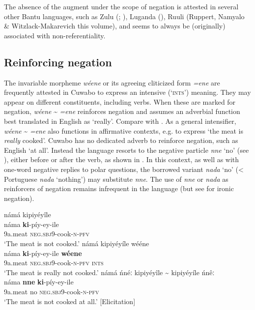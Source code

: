 \documentclass[output=paper,colorlinks=true, citecolor=brown,draftmode]{langscibook}
\begin{document}
The absence of the augment under the scope of negation is attested in several other Bantu languages, such as Zulu (\citealt{Doke1961}; \citealt{Buell2006}), Luganda (\citealt{HymanKatamba1990}), Ruuli (Ruppert, Namyalo \& Witzlack-Makarevich this volume), and seems to always be (originally) associated with non-referentiality.

\subsection{Reinforcing negation}\label{sec:cuw:4.4}
The invariable morpheme \textit{wéene} or its agreeing cliticized form \textit{=ene} are frequent\-ly attested in Cuwabo to express an intensive (‘\textsc{ints}’) meaning. They may appear on different constituents, including verbs. When these are marked for negation, \textit{wéene} {\textasciitilde} \textit{=ene} reinforces negation and assumes an adverbial function best translated in English as ‘really’. Compare  with . As a general intensifier, \textit{wéene} {\textasciitilde} \textit{=ene} also functions in affirmative contexts, e.g. to express ‘the meat is \textit{really} cooked’. Cuwabo has no dedicated adverb to reinforce negation, such as English ‘at all’. Instead the language resorts to the negative particle \textit{nne} ‘no’ (see ), either before or after the verb, as shown in . In this context, as well as with one-word negative replies to polar questions, the borrowed variant \textit{nada} ‘no’ (< Portuguese \textit{nada} ‘nothing’) may substitute \textit{nne}. The use of \textit{nne} or \textit{nada} as reinforcers of negation remains infrequent in the language (but see  for ironic negation).

\ea\label{ex:cuw:78}
    \ea\label{ex:cuw:78a}námá kipiyéyîle\\ 
        \gll náma \textbf{ki}{}-píy-ey-ile  \\
              9a.meat \textsc{neg.sbj9-}cook-\textsc{n-pfv}\\
        \glt ‘The meat is not cooked.’
    \ex\label{ex:cuw:78b}námá kipiyéyíle wééne\\
        \gll  náma \textbf{ki}{}-píy-ey-ile\textbf{} \textbf{wéene}\\
              9a.meat \textsc{neg.sbj9-}cook-\textsc{n-pfv} \textsc{ints}\\
        \glt ‘The meat is really not cooked.’
    \ex\label{ex:cuw:78c} námá ńnéː kipiyéyîle {\textasciitilde} kipiyéyíle ńnêː\\
        \gll  náma \textbf{nne} \textbf{ki}{}-píy-ey-ile  \\
              9a.meat no \textsc{neg.sbj9-}cook-\textsc{n-pfv} \\
        \glt ‘The meat is not cooked at all.’  [Elicitation] 
    \z
\z 
\end{document}
